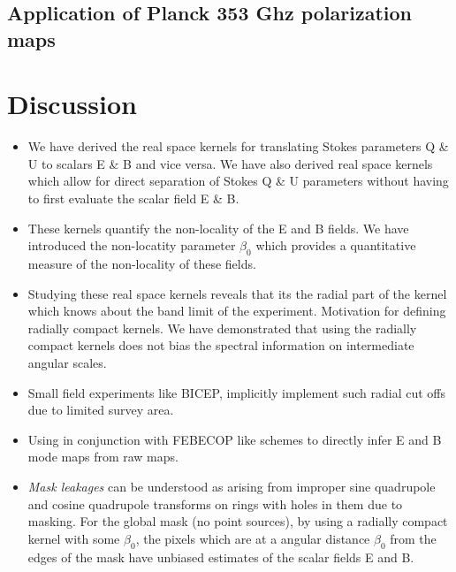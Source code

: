 \subsection{Application of Planck 353 Ghz polarization maps}
%
\begin{figure}[!h] 
\centering
{}
\caption{}
\label{fig:353ghz-eb-maps}
\end{figure}
%
\section{Discussion}\label{sec:discussion}
\begin{itemize}
\item We have derived the real space kernels for translating Stokes parameters Q \& U to scalars E \& B and vice versa. We have also derived real space kernels which allow for direct separation of Stokes Q \& U parameters without having to first evaluate the scalar field E \& B.

\item These kernels quantify the non-locality of the E and B fields. We have introduced the non-locatity parameter $\beta_0$ which provides a quantitative measure of the non-locality of these fields.  

\item Studying these real space kernels reveals that its the radial part of the kernel which knows about the band limit of the experiment. Motivation for defining radially compact kernels. We have demonstrated that using the radially compact kernels does not bias the spectral information on intermediate angular scales.

\item Small field experiments like BICEP, implicitly implement such radial cut offs due to limited survey area. 


\item Using in conjunction with FEBECOP \cite{febecop} like schemes to directly infer E and B mode maps from raw maps.

\item \textit{Mask leakages} can be understood as arising from improper sine quadrupole and cosine quadrupole transforms on rings with holes in them due to masking. For the global mask (no point sources), by using a radially compact kernel with some $\beta_0$, the pixels which are at a angular distance $\beta_0$ from the edges of the mask have unbiased estimates of the scalar fields E and B.

\end{itemize}
%
